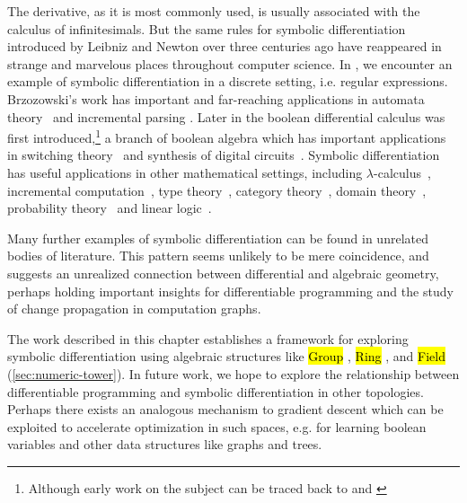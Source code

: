 \documentclass[12pt,initial,twoside,maitrise]{dms}
\newcommand{\inline}[1]{%
    \begingroup%
    \sethlcolor{slightgray}%
    \hl{\ttfamily\footnotesize #1}%
    \endgroup
}
\numberwithin{equation}{section}
\numberwithin{table}{chapter}
\numberwithin{figure}{chapter}
\begin{document}
The derivative, as it is most commonly used, is usually associated with the calculus of infinitesimals. But the same rules for symbolic differentiation introduced by Leibniz and Newton over three centuries ago have reappeared in strange and marvelous places throughout computer science. In \citet{brzozowski1964derivatives}, we encounter an example of symbolic differentiation in a discrete setting, i.e. regular expressions. Brzozowski's work has important and far-reaching applications in automata theory~\citep{berry1986regex, antimirov1996partial, champarnaud1999regular} and incremental parsing \citep{might2011parsing, moss2014derivatives}. Later in \citet{thayse1981boolean} the boolean differential calculus was first introduced,\hspace{-.08em}\footnote{Although early work on the subject can be traced back to \citet{talantsev1959analysis} and \citet{sellers1968analyzing}} a branch of boolean algebra which has important applications in switching theory~\citep{thayse1973boolean} and synthesis of digital circuits~\citep{steinbach2017boolean}. Symbolic differentiation has useful applications in other mathematical settings, including $\lambda$-calculus~\citep{ehrhard2003differential, cai2014theory, kelly2016evolving, brunel2020backpropagation}, incremental computation~\citep{alvarez2019fixing, alvarez2019change}, type theory~\citep{mcbride2001derivative, mcbride2008clowns, chen2012type}, category theory~\citep{blute2006differential, blute2009cartesian}, domain theory~\citep{edalat2002domain}, probability theory~\citep{kac1951probability} and linear logic~\citep{ehrhard2018introduction, clift2018derivatives}.

Many further examples of symbolic differentiation can be found in unrelated bodies of literature. This pattern seems unlikely to be mere coincidence, and suggests an unrealized connection between differential and algebraic geometry, perhaps holding important insights for differentiable programming and the study of change propagation in computation graphs.

The work described in this chapter establishes a framework for exploring symbolic differentiation using algebraic structures like \inline{Group}, \inline{Ring}, and \inline{Field} (\autoref{sec:numeric-tower}). In future work, we hope to explore the relationship between differentiable programming and symbolic differentiation in other topologies. Perhaps there exists an analogous mechanism to gradient descent which can be exploited to accelerate optimization in such spaces, e.g. for learning boolean variables and other data structures like graphs and trees.
\end{document}

